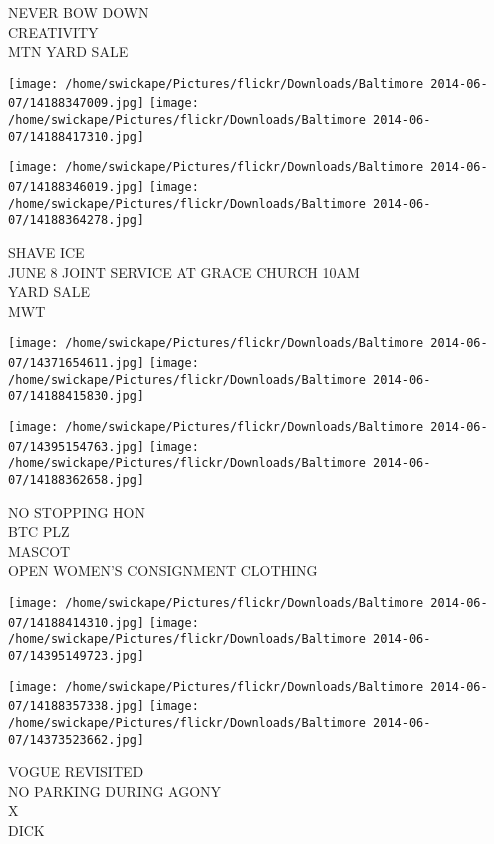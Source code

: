 \documentclass[10pt,letterpaper]{article}
\begin{document}
NEVER BOW DOWN\\
CREATIVITY\\
MTN YARD SALE\\
\pagebreak

\texttt{[image: /home/swickape/Pictures/flickr/Downloads/Baltimore 2014-06-07/14188347009.jpg]}
\texttt{[image: /home/swickape/Pictures/flickr/Downloads/Baltimore 2014-06-07/14188417310.jpg]}

\texttt{[image: /home/swickape/Pictures/flickr/Downloads/Baltimore 2014-06-07/14188346019.jpg]}
\texttt{[image: /home/swickape/Pictures/flickr/Downloads/Baltimore 2014-06-07/14188364278.jpg]}

SHAVE ICE\\
JUNE 8 JOINT SERVICE AT GRACE CHURCH 10AM\\
YARD SALE\\
MWT\\
\pagebreak

\texttt{[image: /home/swickape/Pictures/flickr/Downloads/Baltimore 2014-06-07/14371654611.jpg]}
\texttt{[image: /home/swickape/Pictures/flickr/Downloads/Baltimore 2014-06-07/14188415830.jpg]}

\texttt{[image: /home/swickape/Pictures/flickr/Downloads/Baltimore 2014-06-07/14395154763.jpg]}
\texttt{[image: /home/swickape/Pictures/flickr/Downloads/Baltimore 2014-06-07/14188362658.jpg]}

NO STOPPING HON\\
BTC PLZ\\
MASCOT\\
OPEN WOMEN'S CONSIGNMENT CLOTHING\\
\pagebreak

\texttt{[image: /home/swickape/Pictures/flickr/Downloads/Baltimore 2014-06-07/14188414310.jpg]}
\texttt{[image: /home/swickape/Pictures/flickr/Downloads/Baltimore 2014-06-07/14395149723.jpg]}

\texttt{[image: /home/swickape/Pictures/flickr/Downloads/Baltimore 2014-06-07/14188357338.jpg]}
\texttt{[image: /home/swickape/Pictures/flickr/Downloads/Baltimore 2014-06-07/14373523662.jpg]}

VOGUE REVISITED\\
NO PARKING DURING AGONY\\
X\\
DICK\\
\pagebreak
\end{document}
